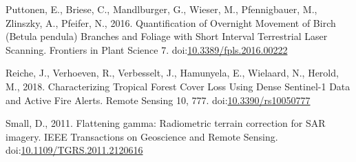\documentclass[]{elsarticle} %
\begin{document}
\leavevmode\hypertarget{ref-Puttonen2016}{}%
Puttonen, E., Briese, C., Mandlburger, G., Wieser, M., Pfennigbauer, M.,
Zlinszky, A., Pfeifer, N., 2016. Quantification of Overnight Movement of
Birch (Betula pendula) Branches and Foliage with Short Interval
Terrestrial Laser Scanning. Frontiers in Plant Science 7.
doi:\href{https://doi.org/10.3389/fpls.2016.00222}{10.3389/fpls.2016.00222}

\leavevmode\hypertarget{ref-Reiche2018}{}%
Reiche, J., Verhoeven, R., Verbesselt, J., Hamunyela, E., Wielaard, N.,
Herold, M., 2018. Characterizing Tropical Forest Cover Loss Using Dense
Sentinel-1 Data and Active Fire Alerts. Remote Sensing 10, 777.
doi:\href{https://doi.org/10.3390/rs10050777}{10.3390/rs10050777}

\leavevmode\hypertarget{ref-Small2011}{}%
Small, D., 2011. Flattening gamma: Radiometric terrain correction for
SAR imagery. IEEE Transactions on Geoscience and Remote Sensing.
doi:\href{https://doi.org/10.1109/TGRS.2011.2120616}{10.1109/TGRS.2011.2120616}
\end{document}
